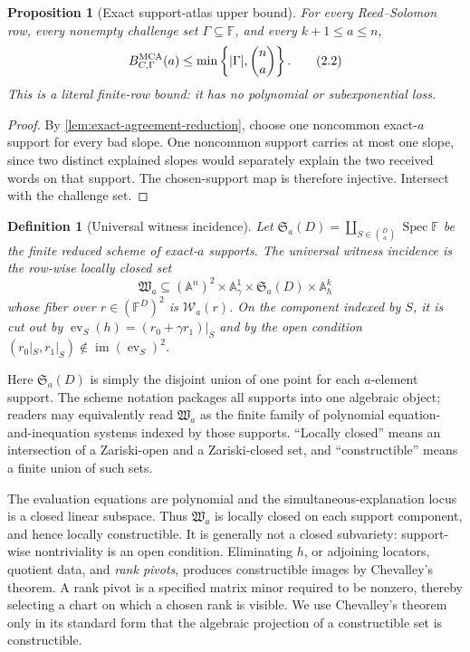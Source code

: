 \documentclass[12pt,a4paper]{amsart}
\numberwithin{equation}{section}
\newtheorem{proposition}[proposition]{Proposition}
\newtheorem{definition}[definition]{Definition}
\theoremstyle{remark}
\DeclareMathOperator{\Spec}{Spec}
\newcommand{\F}{\mathbb F}
\newcommand{\A}{\mathbb A}
\newcommand{\Wcal}{\mathcal W}
\newcommand{\abs}[1]{\lvert #1\rvert}
\begin{document}
\begin{proposition}[Exact support-atlas upper bound]
\label{prop:exact-support-upper}
For every Reed--Solomon row, every nonempty challenge set
\(\Gamma\subseteq\F\), and every \(k+1\le a\le n\),
\[
 B_{C,\Gamma}^{\rm MCA}(a)
 \le\min\left\{\abs\Gamma,\binom na\right\}.        \tag{2.2}
\]
This is a literal finite-row bound: it has no polynomial or
subexponential loss.
\end{proposition}

\begin{proof}
By \cref{lem:exact-agreement-reduction}, choose one noncommon exact-\(a\)
support for every bad slope.  One noncommon support carries at most one
slope, since two distinct explained slopes would separately explain the
two received words on that support.  The chosen-support map is therefore
injective.  Intersect with the challenge set.
\end{proof}

\begin{definition}[Universal witness incidence]
\label{def:universal-witness-incidence}
Let \(\mathfrak S_a(D)=\coprod_{S\in\binom Da}\Spec\F\) be the finite
reduced scheme of exact-\(a\) supports.  The \emph{universal witness
incidence} is the row-wise locally closed set
\[
 \mathfrak W_a\subseteq
 (\A^n)^2\times\A^1_\gamma\times
 \mathfrak S_a(D)\times\A^k_h
 \]
whose fiber over \(r\in(\F^D)^2\) is \(\Wcal_a(r)\).  On the component
indexed by \(S\), it is cut out by
\(\operatorname{ev}_S(h)=(r_0+\gamma r_1)|_S\) and by the open condition
\((r_0|_S,r_1|_S)\notin
 \operatorname{im}(\operatorname{ev}_S)^2\).
\end{definition}

Here \(\mathfrak S_a(D)\) is simply the disjoint union of one point for each
\(a\)-element support.  The scheme notation packages all supports into one
algebraic object; readers may equivalently read \(\mathfrak W_a\) as the
finite family of polynomial equation-and-inequation systems indexed by
those supports.  ``Locally closed'' means an intersection of a Zariski-open
and a Zariski-closed set, and ``constructible'' means a finite union of such
sets.

The evaluation equations are polynomial and the simultaneous-explanation
locus is a closed linear subspace.  Thus \(\mathfrak W_a\) is locally
closed on each support component, and hence locally constructible.  It is
generally not a closed subvariety: support-wise nontriviality is an open
condition.  Eliminating \(h\), or adjoining locators, quotient data, and
\emph{rank pivots}, produces constructible images by Chevalley's theorem.
A rank pivot is a specified matrix minor required to be nonzero, thereby
selecting a chart on which a chosen rank is visible.  We use Chevalley's
theorem only in its standard form that the algebraic projection of a
constructible set is constructible.
\end{document}
